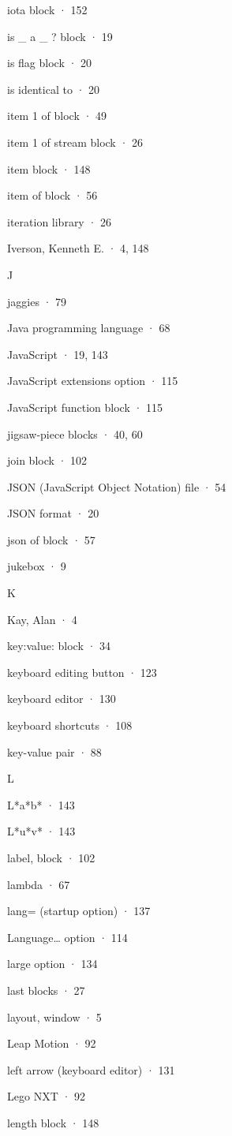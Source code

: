 iota block · 152

is \_ a \_ ? block · 19

is flag block · 20

is identical to · 20

item 1 of block · 49

item 1 of stream block · 26

item block · 148

item of block · 56

iteration library · 26

Iverson, Kenneth E. · 4, 148

J

jaggies · 79

Java programming language · 68

JavaScript · 19, 143

JavaScript extensions option · 115

JavaScript function block · 115

jigsaw-piece blocks · 40, 60

join block · 102

JSON (JavaScript Object Notation) file · 54

JSON format · 20

json of block · 57

jukebox · 9

K

Kay, Alan · 4

key:value: block · 34

keyboard editing button · 123

keyboard editor · 130

keyboard shortcuts · 108

key-value pair · 88

L

L*a*b* · 143

L*u*v* · 143

label, block · 102

lambda · 67

lang= (startup option) · 137

Language\ldots{} option · 114

large option · 134

last blocks · 27

layout, window · 5

Leap Motion · 92

left arrow (keyboard editor) · 131

Lego NXT · 92

length block · 148

